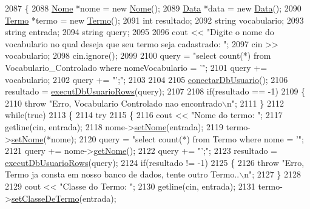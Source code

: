 \begin{DoxyCode}
2087 \{
2088   \mbox{\hyperlink{class_nome}{Nome}} *nome = \textcolor{keyword}{new} \mbox{\hyperlink{class_nome}{Nome}}();
2089   \mbox{\hyperlink{class_data}{Data}} *data = \textcolor{keyword}{new} \mbox{\hyperlink{class_data}{Data}}();
2090   \mbox{\hyperlink{class_termo}{Termo}} *termo = \textcolor{keyword}{new} \mbox{\hyperlink{class_termo}{Termo}}();
2091 \textcolor{keywordtype}{int} resultado;
2092   \textcolor{keywordtype}{string} vocabulario;
2093   \textcolor{keywordtype}{string} entrada;
2094   \textcolor{keywordtype}{string} query;
2095 
2096   cout << \textcolor{stringliteral}{"Digite o nome do vocabulario no qual deseja que seu termo seja cadastrado: "};
2097   cin >> vocabulario;
2098   cin.ignore();
2099 
2100   query = \textcolor{stringliteral}{"select count(*) from Vocabulario\_Controlado where nomeVocabulario = '"};
2101   query += vocabulario;
2102   query += \textcolor{stringliteral}{"';"};
2103 
2104 
2105   \mbox{\hyperlink{comando_sql_8cpp_a4f89ddcbc4cf8f2587d89f72f8c7900d}{conectarDbUsuario}}();
2106   resultado = \mbox{\hyperlink{comando_sql_8cpp_af54952694f2fa7d76f969fb74b853cb9}{executDbUsuarioRows}}(query);
2107 
2108   \textcolor{keywordflow}{if}(resultado == -1)
2109   \{
2110     \textcolor{keywordflow}{throw} \textcolor{stringliteral}{"Erro, Vocabulario Controlado nao encontrado\(\backslash\)n"};
2111   \}
2112 \textcolor{keywordflow}{while}(\textcolor{keyword}{true})
2113 \{
2114   \textcolor{keywordflow}{try}
2115   \{
2116     cout << \textcolor{stringliteral}{"Nome do termo: "};
2117     getline(cin, entrada);
2118     nome->\mbox{\hyperlink{class_nome_a83b9f56ec9f86f4b976846f4c5c65b30}{setNome}}(entrada);
2119     termo->\mbox{\hyperlink{class_termo_a43246196cccd6fa074731e93ac15f07a}{setNome}}(*nome);
2120     query = \textcolor{stringliteral}{"select count(*) from Termo where nome = '"};
2121     query += nome->\mbox{\hyperlink{class_nome_aad41176173eec20cbbae1576447a3697}{getNome}}();
2122     query += \textcolor{stringliteral}{"';"};
2123     resultado = \mbox{\hyperlink{comando_sql_8cpp_af54952694f2fa7d76f969fb74b853cb9}{executDbUsuarioRows}}(query);
2124     \textcolor{keywordflow}{if}(resultado != -1)
2125     \{
2126       \textcolor{keywordflow}{throw} \textcolor{stringliteral}{"Erro, Termo ja consta em nosso banco de dados, tente outro Termo..\(\backslash\)n"};
2127     \}
2128 
2129     cout << \textcolor{stringliteral}{"Classe do Termo: "};
2130     getline(cin, entrada);
2131     termo->\mbox{\hyperlink{class_termo_a8c32e501b39e008ea369650e3eb196b1}{setClasseDeTermo}}(entrada);

\end{DoxyCode}
